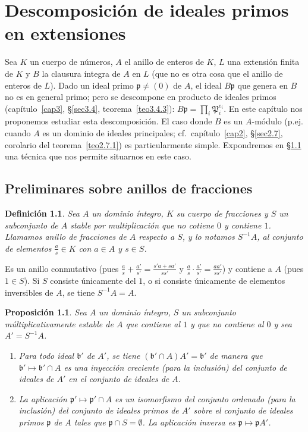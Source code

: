\documentclass[bibtotoc,leqno,spanish]{amsbook}
\let\emph\relax %
\newcommand{\idl}[1]{\mathfrak{#1}}
\numberwithin{equation}{section}
\theoremstyle{note}
\newtheorem{definition}{Definici\'on}
\theoremstyle{note}
\newtheorem{proposition}{Proposici\'on}
\theoremstyle{rem}
\numberwithin{theorem}{section}
\numberwithin{proposition}{section}
\numberwithin{definition}{section}
\numberwithin{lemma}{section}
\numberwithin{corollary}{section}
\numberwithin{example}{section}
\numberwithin{footnote}{section}%
\begin{document}
\chapter{Descomposici\'on de ideales primos en extensiones}\label{cap5}

Sea $K$ un cuerpo de n\'umeros, $A$ el anillo de enteros de $K$, $L$ una extensi\'on finita de $K$ y $B$
la clausura \'integra de $A$ en $L$ (que no es otra cosa que el anillo de enteros de $L$). Dado un ideal primo
$\idl{p}\neq(0)$ de $A$, el ideal $B\idl{p}$ que genera en $B$ no es en general primo; pero se descompone en
producto de ideales primos (cap\'itulo~\ref{cap3}, \S\ref{sec3.4}, teorema~\ref{teo3.4.3}): $B\idl{p}=\prod_{i}\idl{P}_{i}^{e_{i}}$. En este
cap\'itulo nos proponemos estudiar esta descomposici\'on. El caso donde $B$ es un $A$-m\'odulo \emph{libre}
(p.ej. cuando $A$ es un dominio de ideales principales;
cf.~cap\'itulo~\ref{cap2}, \S\ref{sec2.7}, corolario del teorema~\ref{teo2.7.1}) es particularmente
simple. Expondremos en \S\ref{sec5.1} una t\'ecnica que nos permite situarnos en este caso.

\section{Preliminares sobre anillos de fracciones}\label{sec5.1}

\begin{definition}
Sea $A$ un dominio \'integro, $K$ su cuerpo de fracciones y $S$ un subconjunto de $A$ stable por multiplicaci\'on
que no cotiene $0$ y contiene $1$. Llamamos anillo de fracciones de $A$ respecto a $S$, y lo notamos $S^{-1}A$,
al conjunto de elementos $\frac{a}{s}\in K$ con $a\in A$ y $s\in S$.
\end{definition}

Es un anillo conmutativo (pues $\frac{a}{s}+\frac{a'}{s'} = \frac{s'a+sa'}{ss'}$ y $\frac{a}{s}\cdot\frac{a'}{s'}=
\frac{aa'}{ss'}$) y contiene a $A$ (pues $1\in S$). Si $S$ consiste \'unicamente del $1$, o si consiste \'unicamente
de elementos inversibles de $A$, se tiene $S^{-1}A=A$.

\begin{proposition}\label{prop5.1.1}
Sea $A$ un dominio \'integro, $S$ un subconjunto m\'ultiplicativamente estable de $A$ que contiene al $1$ y
que no contiene al $0$ y sea $A' = S^{-1}A$.
\begin{enumerate}
\item[1.]
Para todo ideal $\idl{b}'$ de $A'$, se tiene $(\idl{b}'\cap A)A' = \idl{b}'$ de manera que
$\idl{b}'\mapsto\idl{b}'\cap A$ es una inyecci\'on creciente (para la inclusi\'on) del conjunto de ideales de $A'$
en el conjunto de ideales de $A$.
\item[2.]
La aplicaci\'on $\idl{p}'\mapsto\idl{p}'\cap A$ es un isomorfismo del conjunto ordenado (para la inclusi\'on)
del conjunto de ideales primos de $A'$ sobre el conjunto de ideales primos $\idl{p}$ de $A$ tales que
$\idl{p}\cap S=\emptyset$. La aplicaci\'on inversa es $\idl{p}\mapsto\idl{p}A'$.
\end{enumerate}
\end{proposition}
\end{document}
